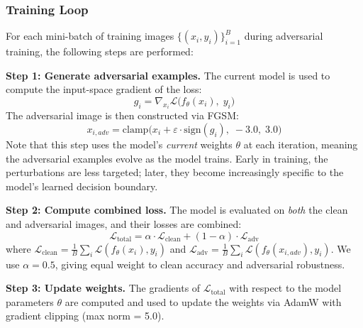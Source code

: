 \documentclass[conference]{IEEEtran}
\begin{document}
\subsubsection{Training Loop}

For each mini-batch of training images $\{(x_i, y_i)\}_{i=1}^{B}$ during adversarial training, the following steps are performed:

\textbf{Step 1: Generate adversarial examples.} The current model is used to compute the input-space gradient of the loss:
\begin{equation}
    g_i = \nabla_{x_i} \mathcal{L}\big(f_\theta(x_i),\; y_i\big)
\end{equation}
The adversarial image is then constructed via FGSM:
\begin{equation}
    x_{i,adv} = \text{clamp}\big(x_i + \varepsilon \cdot \text{sign}(g_i),\; -3.0,\; 3.0\big)
\end{equation}
Note that this step uses the model's \textit{current} weights $\theta$ at each iteration, meaning the adversarial examples evolve as the model trains. Early in training, the perturbations are less targeted; later, they become increasingly specific to the model's learned decision boundary.

\textbf{Step 2: Compute combined loss.} The model is evaluated on \textit{both} the clean and adversarial images, and their losses are combined:
\begin{equation}
    \mathcal{L}_{\text{total}} = \alpha \cdot \mathcal{L}_{\text{clean}} + (1 - \alpha) \cdot \mathcal{L}_{\text{adv}}
    \label{eq:adv_training}
\end{equation}
where $\mathcal{L}_{\text{clean}} = \frac{1}{B}\sum_i \mathcal{L}(f_\theta(x_i), y_i)$ and $\mathcal{L}_{\text{adv}} = \frac{1}{B}\sum_i \mathcal{L}(f_\theta(x_{i,adv}), y_i)$. We use $\alpha = 0.5$, giving equal weight to clean accuracy and adversarial robustness.

\textbf{Step 3: Update weights.} The gradients of $\mathcal{L}_{\text{total}}$ with respect to the model parameters $\theta$ are computed and used to update the weights via AdamW with gradient clipping (max norm = 5.0).
\end{document}
